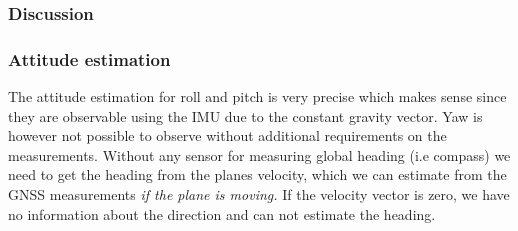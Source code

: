 \subsubsection{Discussion}

\subsubsection{Attitude estimation}
The attitude estimation for roll and pitch is very precise which makes sense since they are observable using the IMU due to the constant gravity vector. Yaw is however not possible to observe without additional requirements on the measurements. Without any sensor for measuring global heading (i.e compass) we need to get the heading from the planes velocity, which we can estimate from the GNSS measurements \textit{if the plane is moving.} If the velocity vector is zero, we have no information about the direction and can not estimate the heading. 

\


